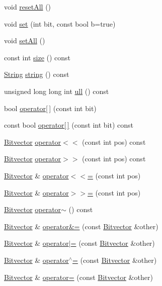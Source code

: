 \begin{DoxyCompactItemize}
\item 
void \hyperlink{classprism_1_1_bitvector_abdf123d4a94086c5525ce7d8eed8a6e3}{reset\+All} ()
\item 
void \hyperlink{classprism_1_1_bitvector_af6dd4b91e57bb6a95f30c55fdb1ce6a5}{set} (int bit, const bool b=true)
\item 
void \hyperlink{classprism_1_1_bitvector_aaa4362884a96b180fd45dd261423a7e3}{set\+All} ()
\item 
const int \hyperlink{classprism_1_1_bitvector_aefc31462d8a52013191e0df4f45ccae4}{size} () const 
\item 
\hyperlink{classprism_1_1_string}{String} \hyperlink{classprism_1_1_bitvector_abc220bdae95129cf71bb8ec70a877899}{string} () const 
\item 
unsigned long long int \hyperlink{classprism_1_1_bitvector_a63cc622f069e65f1b55e920927c3dc66}{ull} () const 
\item 
bool \hyperlink{classprism_1_1_bitvector_ab73a3eac53e5df3dc80486eddd1b8f3c}{operator\mbox{[}$\,$\mbox{]}} (const int bit)
\item 
const bool \hyperlink{classprism_1_1_bitvector_a2fcdd5ed5190df6a211e85c0b77a125a}{operator\mbox{[}$\,$\mbox{]}} (const int bit) const 
\item 
\hyperlink{classprism_1_1_bitvector}{Bitvector} \hyperlink{classprism_1_1_bitvector_a0d5163be9867dee195648df83273076a}{operator$<$$<$} (const int pos) const 
\item 
\hyperlink{classprism_1_1_bitvector}{Bitvector} \hyperlink{classprism_1_1_bitvector_a8cb5d12bfecf59503a0e9d9e4bbfa0e8}{operator$>$$>$} (const int pos) const 
\item 
\hyperlink{classprism_1_1_bitvector}{Bitvector} \& \hyperlink{classprism_1_1_bitvector_acf4750aad13fcdb2c1cc3f301ec6debf}{operator$<$$<$=} (const int pos)
\item 
\hyperlink{classprism_1_1_bitvector}{Bitvector} \& \hyperlink{classprism_1_1_bitvector_a540f30c24a85e912c2a5d1d37241b89a}{operator$>$$>$=} (const int pos)
\item 
\hyperlink{classprism_1_1_bitvector}{Bitvector} \hyperlink{classprism_1_1_bitvector_ad5b9a350288e1f843f905de537215248}{operator$\sim$} () const 
\item 
\hyperlink{classprism_1_1_bitvector}{Bitvector} \& \hyperlink{classprism_1_1_bitvector_add4358afe6add8467aa32428cb13f823}{operator\&=} (const \hyperlink{classprism_1_1_bitvector}{Bitvector} \&other)
\item 
\hyperlink{classprism_1_1_bitvector}{Bitvector} \& \hyperlink{classprism_1_1_bitvector_ab11cf7a1216570e16f90f4390eb623ff}{operator$\vert$=} (const \hyperlink{classprism_1_1_bitvector}{Bitvector} \&other)
\item 
\hyperlink{classprism_1_1_bitvector}{Bitvector} \& \hyperlink{classprism_1_1_bitvector_a5b4ba0d10a0b620cebc0d8676180ed72}{operator$^\wedge$=} (const \hyperlink{classprism_1_1_bitvector}{Bitvector} \&other)
\item 
\hyperlink{classprism_1_1_bitvector}{Bitvector} \& \hyperlink{classprism_1_1_bitvector_a84f45db3420a5ef90d64997823924dc9}{operator=} (const \hyperlink{classprism_1_1_bitvector}{Bitvector} \&other)
\end{DoxyCompactItemize}
